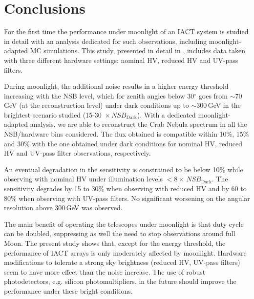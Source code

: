 \documentclass{PoS}
\begin{document}
\section{Conclusions}

For the first time the performance under moonlight of an IACT system is studied in detail with an analysis dedicated for such observations, including moonlight-adapted MC simulations. This study, presented in detail in \cite{MAGIC_moon}, includes data taken with three different hardware settings: nominal HV, reduced HV and UV-pass filters.

During moonlight, the additional noise results in a higher energy threshold increasing with the NSB level, which for zenith angles below 30$^{\circ}$ goes from $\sim$70\,GeV (at the reconstruction level) under dark conditions up to $\sim$300\,GeV in the brightest scenario studied (15-30~$\times  \, \textit{NSB}_{\text{Dark}}$). With a dedicated moonlight-adapted analysis, we are able to reconstruct the Crab Nebula spectrum in all the NSB/hardware bins considered. The flux obtained is compatible within 10\%, 15\% and 30\% with the one obtained under dark conditions for nominal HV, reduced HV and UV-pass filter observations, respectively.

An eventual degradation in the sensitivity is constrained to be below 10\% while observing with nominal HV under illumination levels $<8 \times  \, \textit{NSB}_{\text{Dark}}$. The sensitivity degrades by 15 to 30\% when observing with reduced HV and by 60 to 80\% when observing with UV-pass filters. No significant worsening on the angular resolution above 300\,GeV was observed.

The main benefit of operating the telescopes under moonlight is that duty cycle can be doubled, suppressing as well the need to stop observations around full Moon. The present study shows that, except for the energy threshold, the performance of IACT arrays is only moderately affected by moonlight. Hardware modifications to tolerate a strong sky brightness (reduced HV, UV-pass filters) seem to have more effect than the noise increase. The use of robust photodetectors, e.g. silicon photomultipliers, in the future should improve the performance under these bright conditions.
\end{document}

